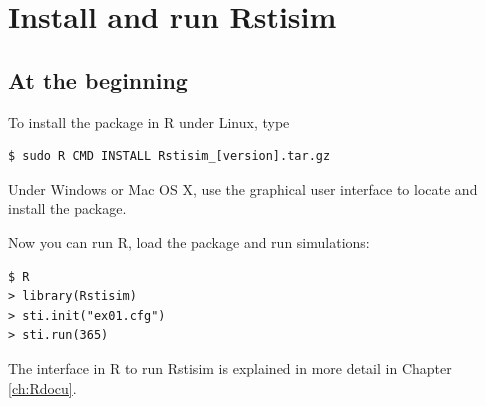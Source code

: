 \documentclass[11pt]{article}
\begin{document}
\section{Install and run Rstisim}
\label{ch:install}
\subsection{At the beginning}

% 

To install the package in R under Linux, type
\begin{verbatim}
$ sudo R CMD INSTALL Rstisim_[version].tar.gz
\end{verbatim}
Under Windows or Mac OS X, use the graphical user interface to locate and
install the package.

Now you can run R, load the package and run simulations:
\begin{verbatim}
$ R
> library(Rstisim)
> sti.init("ex01.cfg")
> sti.run(365)
\end{verbatim}
The interface in R to run Rstisim is explained in more detail in Chapter \ref{ch:Rdocu}.
\end{document}
